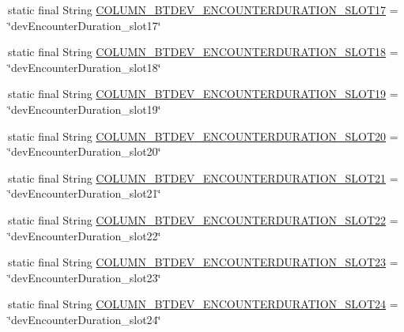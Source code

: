 \begin{DoxyCompactItemize}
\item 
static final String \hyperlink{classcom_1_1copelabs_1_1oiframework_1_1socialproximity_1_1_s_q_lite_helper_abe4d2d079d8870535425368d8e2a562a}{C\+O\+L\+U\+M\+N\+\_\+\+B\+T\+D\+E\+V\+\_\+\+E\+N\+C\+O\+U\+N\+T\+E\+R\+D\+U\+R\+A\+T\+I\+O\+N\+\_\+\+S\+L\+O\+T17} = \char`\"{}dev\+Encounter\+Duration\+\_\+slot17\char`\"{}
\item 
static final String \hyperlink{classcom_1_1copelabs_1_1oiframework_1_1socialproximity_1_1_s_q_lite_helper_adc550089f462600d2fef7b81986fd217}{C\+O\+L\+U\+M\+N\+\_\+\+B\+T\+D\+E\+V\+\_\+\+E\+N\+C\+O\+U\+N\+T\+E\+R\+D\+U\+R\+A\+T\+I\+O\+N\+\_\+\+S\+L\+O\+T18} = \char`\"{}dev\+Encounter\+Duration\+\_\+slot18\char`\"{}
\item 
static final String \hyperlink{classcom_1_1copelabs_1_1oiframework_1_1socialproximity_1_1_s_q_lite_helper_af3fb4759e642965c9dc97713aedb9c7a}{C\+O\+L\+U\+M\+N\+\_\+\+B\+T\+D\+E\+V\+\_\+\+E\+N\+C\+O\+U\+N\+T\+E\+R\+D\+U\+R\+A\+T\+I\+O\+N\+\_\+\+S\+L\+O\+T19} = \char`\"{}dev\+Encounter\+Duration\+\_\+slot19\char`\"{}
\item 
static final String \hyperlink{classcom_1_1copelabs_1_1oiframework_1_1socialproximity_1_1_s_q_lite_helper_a79779a8ba3f8e445a4c9b3a9c242bab8}{C\+O\+L\+U\+M\+N\+\_\+\+B\+T\+D\+E\+V\+\_\+\+E\+N\+C\+O\+U\+N\+T\+E\+R\+D\+U\+R\+A\+T\+I\+O\+N\+\_\+\+S\+L\+O\+T20} = \char`\"{}dev\+Encounter\+Duration\+\_\+slot20\char`\"{}
\item 
static final String \hyperlink{classcom_1_1copelabs_1_1oiframework_1_1socialproximity_1_1_s_q_lite_helper_ab9f012c761286e358e37aceeb9354ff2}{C\+O\+L\+U\+M\+N\+\_\+\+B\+T\+D\+E\+V\+\_\+\+E\+N\+C\+O\+U\+N\+T\+E\+R\+D\+U\+R\+A\+T\+I\+O\+N\+\_\+\+S\+L\+O\+T21} = \char`\"{}dev\+Encounter\+Duration\+\_\+slot21\char`\"{}
\item 
static final String \hyperlink{classcom_1_1copelabs_1_1oiframework_1_1socialproximity_1_1_s_q_lite_helper_acb117913601710773e1abf9c34ef21e8}{C\+O\+L\+U\+M\+N\+\_\+\+B\+T\+D\+E\+V\+\_\+\+E\+N\+C\+O\+U\+N\+T\+E\+R\+D\+U\+R\+A\+T\+I\+O\+N\+\_\+\+S\+L\+O\+T22} = \char`\"{}dev\+Encounter\+Duration\+\_\+slot22\char`\"{}
\item 
static final String \hyperlink{classcom_1_1copelabs_1_1oiframework_1_1socialproximity_1_1_s_q_lite_helper_a20e3a923ddcf0df4318349a69851ec3b}{C\+O\+L\+U\+M\+N\+\_\+\+B\+T\+D\+E\+V\+\_\+\+E\+N\+C\+O\+U\+N\+T\+E\+R\+D\+U\+R\+A\+T\+I\+O\+N\+\_\+\+S\+L\+O\+T23} = \char`\"{}dev\+Encounter\+Duration\+\_\+slot23\char`\"{}
\item 
static final String \hyperlink{classcom_1_1copelabs_1_1oiframework_1_1socialproximity_1_1_s_q_lite_helper_a2c7cd6032d517eee9403df316b05f432}{C\+O\+L\+U\+M\+N\+\_\+\+B\+T\+D\+E\+V\+\_\+\+E\+N\+C\+O\+U\+N\+T\+E\+R\+D\+U\+R\+A\+T\+I\+O\+N\+\_\+\+S\+L\+O\+T24} = \char`\"{}dev\+Encounter\+Duration\+\_\+slot24\char`\"{}

\end{DoxyCompactItemize}
